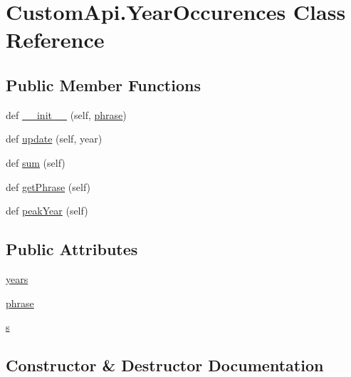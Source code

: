 \hypertarget{class_custom_api_1_1_year_occurences}{}\section{Custom\+Api.\+Year\+Occurences Class Reference}
\label{class_custom_api_1_1_year_occurences}
\subsection*{Public Member Functions}
\begin{DoxyCompactItemize}
\item 
def \mbox{\hyperlink{class_custom_api_1_1_year_occurences_a92409f087893f7600c31cf4903605eb0}{\+\_\+\+\_\+init\+\_\+\+\_\+}} (self, \mbox{\hyperlink{class_custom_api_1_1_year_occurences_a9bd0f748cbf58257e11523a59b465736}{phrase}})
\item 
def \mbox{\hyperlink{class_custom_api_1_1_year_occurences_a164878b4e95bf65cca57203625e4389f}{update}} (self, year)
\item 
def \mbox{\hyperlink{class_custom_api_1_1_year_occurences_a78e7c975818eb3d89b361296a0bd2561}{sum}} (self)
\item 
def \mbox{\hyperlink{class_custom_api_1_1_year_occurences_ad6afee5c94beef53e7727dd560455158}{get\+Phrase}} (self)
\item 
def \mbox{\hyperlink{class_custom_api_1_1_year_occurences_afae311ac4c28157ddcc1538730cd0e0a}{peak\+Year}} (self)
\end{DoxyCompactItemize}
\subsection*{Public Attributes}
\begin{DoxyCompactItemize}
\item 
\mbox{\hyperlink{class_custom_api_1_1_year_occurences_a5d4b1357eda74a067c2b1fde7ff66aeb}{years}}
\item 
\mbox{\hyperlink{class_custom_api_1_1_year_occurences_a9bd0f748cbf58257e11523a59b465736}{phrase}}
\item 
\mbox{\hyperlink{class_custom_api_1_1_year_occurences_a949697ee43da0cd7e43ceaf1b6777126}{s}}
\end{DoxyCompactItemize}


\subsection{Constructor \& Destructor Documentation}
\mbox{\label{class_custom_api_1_1_year_occurences_a92409f087893f7600c31cf4903605eb0}} 
